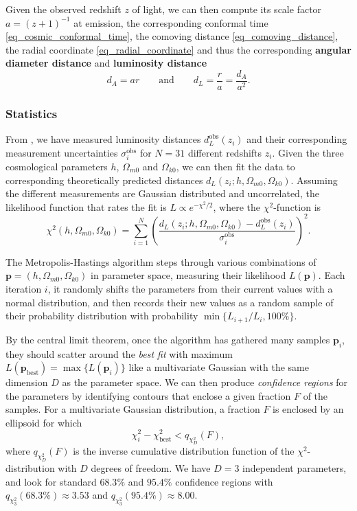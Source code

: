 \documentclass[10pt,a4paper]{article}
\begin{document}
Given the observed redshift $z$ of light,
we can then compute its scale factor $a = (z+1)^{-1}$ at emission,
the corresponding conformal time \eqref{eq_cosmic_conformal_time},
the comoving distance \eqref{eq_comoving_distance}, the radial coordinate \eqref{eq_radial_coordinate}
and thus the corresponding \textbf{angular diameter distance} and \textbf{luminosity distance}
\begin{equation}
	d_A = a r
	\qquad \text{and} \qquad
	d_L = \frac{r}{a} = \frac{d_A}{a^2}.
\label{eq_distances}
\end{equation}

\subsubsection*{Statistics}

From \cite{betouleImprovedCosmologicalConstraints2014},
we have measured luminosity distances $d_{L}^\text{obs}(z_i)$ and their
corresponding measurement uncertainties $\sigma_i^\text{obs}$
for $N=31$ different redshifts $z_i$.
Given the three cosmological parameters $h$, $\Omega_{m0}$ and $\Omega_{k0}$,
we can then fit the data to corresponding theoretically predicted distances $d_L(z_i; h, \Omega_{m0}, \Omega_{k0})$.
Assuming the different measurements are Gaussian distributed and uncorrelated,
the likelihood function that rates the fit is $L \propto e^{-\chi^2/2}$, where the $\chi^2$-function is
\begin{equation}
	\chi^2(h,\Omega_{m0},\Omega_{k0}) = \sum_{i=1}^{N} \left( \frac{d_L(z_i; h, \Omega_{m0}, \Omega_{k0}) - d_{L}^\text{obs}(z_i)}{\sigma_i^\text{obs}} \right)^2.
\label{eq_chi2}
\end{equation}

The Metropolis-Hastings algorithm steps through various combinations of $\mathbf{p} = (h,\Omega_{m0},\Omega_{k0})$ in parameter space, measuring their likelihood $L(\mathbf{p})$.
Each iteration $i$, it randomly shifts the parameters from their current values with a normal distribution,
and then records their new values as a random sample of their probability distribution with probability $\min\big\{L_{i+1}/L_i, 100\%\big\}$.

By the central limit theorem, once the algorithm has gathered many samples $\mathbf{p}_i$,
they should scatter around the \emph{best fit}
with maximum $L(\mathbf{p}_\text{best}) = \max\{L(\mathbf{p}_i)\}$
like a multivariate Gaussian with the same dimension $D$ as the parameter space.
We can then produce \emph{confidence regions} for the parameters
by identifying contours that enclose a given fraction $F$ of the samples.
For a multivariate Gaussian distribution, a fraction $F$ is enclosed by an ellipsoid
for which
\begin{equation}
	\chi^2_i - \chi^2_\text{best} < q_{\chi^2_D}(F),
\label{eq_confidence_region}
\end{equation}
where $q_{\chi^2_D}(F)$ is the inverse cumulative distribution function of the $\chi^2$-distribution with $D$ degrees of freedom.
We have $D=3$ independent parameters, and look for standard $68.3\%$ and $95.4\%$ confidence regions
with $q_{\chi^2_3}(68.3\%) \approx 3.53$ and $q_{\chi^2_3}(95.4\%) \approx 8.00$.
\end{document}
